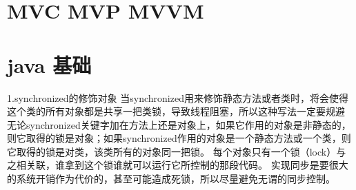\documentclass[9pt, b5paper]{article}
\begin{document}
\section{MVC MVP MVVM}
\label{sec-18}

\section{java 基础}
\label{sec-19}
1.synchronized的修饰对象
当synchronized用来修饰静态方法或者类时，将会使得这个类的所有对象都是共享一把类锁，导致线程阻塞，所以这种写法一定要规避
无论synchronized关键字加在方法上还是对象上，如果它作用的对象是非静态的，则它取得的锁是对象；如果synchronized作用的对象是一个静态方法或一个类，则它取得的锁是对类，该类所有的对象同一把锁。
每个对象只有一个锁（lock）与之相关联，谁拿到这个锁谁就可以运行它所控制的那段代码。
实现同步是要很大的系统开销作为代价的，甚至可能造成死锁，所以尽量避免无谓的同步控制。
\end{document}
